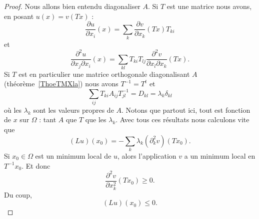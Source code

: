 \begin{proof}
	Nous allons bien entendu diagonaliser \( A\). Si \( T\) est une matrice nous avons, en posant \( u(x)=v(Tx)\) :
	\begin{equation}
		\frac{ \partial u }{ \partial x_i }(x)=\sum_k\frac{ \partial v }{ \partial x_k }(Tx)T_{ki}
	\end{equation}
	et
	\begin{equation}
		\frac{ \partial^2u }{ \partial x_j\partial x_i }(x)=\sum_{kl}T_{ki}T_{lj}\frac{ \partial^2v }{ \partial x_l\partial x_k }(Tx).
	\end{equation}
	Si \( T\) est en particulier une matrice orthogonale diagonalisant \( A\) (théorème~\ref{ThoeTMXla}) nous avons \( T^{-1}=T^t\) et
	\begin{equation}
		\sum_{ij}T_{ki}A_{ij}T^{-1}_{jl}=D_{kl}=\lambda_k\delta_{kl}
	\end{equation}
	où les \( \lambda_k\) sont les valeurs propres de \( A\). Notons que partout ici, tout est fonction de \( x\) sur \( \Omega\) : tant \( A\) que \( T\) que les \( \lambda_k\). Avec tous ces résultats nous calculons vite que
	\begin{equation}
		(Lu)(x_0)=-\sum_k\lambda_k(\partial^2_kv)(Tx_0).
	\end{equation}
	Si \( x_0\in \Omega\) est un minimum local de \( u\), alors l'application \( v\) a un minimum local en \( T^{-1} x_0\). Et donc
	\begin{equation}
		\frac{ \partial^2v }{ \partial x_k^2 }(Tx_0)\geq 0.
	\end{equation}
	Du coup,
	\begin{equation}
		(Lu)(x_0)\leq 0.
	\end{equation}
\end{proof}


